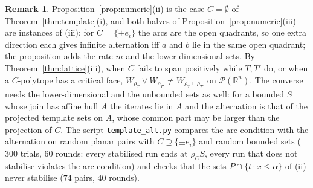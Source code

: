 \documentclass[11pt]{amsart}
\theoremstyle{definition}
\newtheorem{rem}[thm]{Remark}
\newcommand{\cP}{\mathcal P}
\begin{document}
\begin{rem}\label{rem:template}
Proposition~\ref{prop:numeric}(ii) is the case $C=\emptyset$ of
Theorem~\ref{thm:template}(i), and both halves of
Proposition~\ref{prop:numeric}(iii) are instances of (iii): for $C=\{\pm
e_i\}$ the arcs are the open quadrants, so one extra direction each gives
infinite alternation iff $a$ and $b$ lie in the same open quadrant; the
proposition adds the rate $m$ and the lower-dimensional sets. By
Theorem~\ref{thm:lattice}(iii), when $C$ fails to span positively while
$T,T'$ do, or when a $C$-polytope has a critical face, $W_{\rho_T}\vee
W_{\rho_{T'}}\ne W_{\rho_T\sqcup\rho_{T'}}$ on $\cP(\mathbb R^n)$. The
converse needs the lower-dimensional and the unbounded sets as well: for
a bounded $S$ whose join has affine hull $A$ the iterates lie in $A$ and
the alternation is that of the projected template sets on $A$, whose
common part may be larger than the projection of $C$. The script
\texttt{template\_alt.py} compares the arc condition with the
alternation on random planar pairs with $C\supseteq\{\pm e_i\}$ and
random bounded sets ($300$ trials, $60$ rounds: every stabilised run
ends at $\rho_CS$, every run that does not stabilise violates the arc
condition) and checks that the sets $P\cap\{t\cdot x\le\alpha\}$ of
(ii) never stabilise ($74$ pairs, $40$ rounds).
\end{rem}
\end{document}
